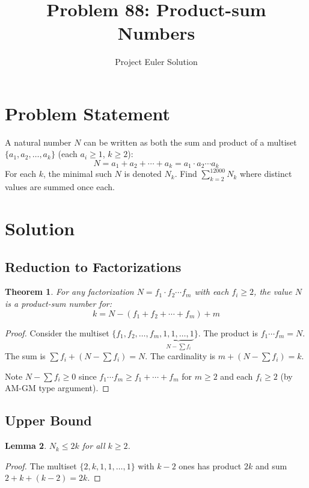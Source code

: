 \documentclass[12pt,a4paper]{article}
\title{Problem 88: Product-sum Numbers}
\author{Project Euler Solution}
\date{}
\newtheorem{theorem}{Theorem}
\newtheorem{lemma}[theorem]{Lemma}
\theoremstyle{definition}
\begin{document}
\maketitle

\section{Problem Statement}
A natural number $N$ can be written as both the sum and product of a multiset $\{a_1, a_2, \ldots, a_k\}$ (each $a_i \ge 1$, $k \ge 2$):
\[
N = a_1 + a_2 + \cdots + a_k = a_1 \cdot a_2 \cdots a_k
\]
For each $k$, the minimal such $N$ is denoted $N_k$. Find $\displaystyle\sum_{k=2}^{12000} N_k$ where distinct values are summed once each.

\section{Solution}

\subsection{Reduction to Factorizations}
\begin{theorem}
For any factorization $N = f_1 \cdot f_2 \cdots f_m$ with each $f_i \ge 2$, the value $N$ is a product-sum number for:
\[
k = N - (f_1 + f_2 + \cdots + f_m) + m
\]
\end{theorem}

\begin{proof}
Consider the multiset $\{f_1, f_2, \ldots, f_m, \underbrace{1, 1, \ldots, 1}_{N - \sum f_i}\}$. The product is $f_1 \cdots f_m = N$. The sum is $\sum f_i + (N - \sum f_i) = N$. The cardinality is $m + (N - \sum f_i) = k$.

Note $N - \sum f_i \ge 0$ since $f_1 \cdots f_m \ge f_1 + \cdots + f_m$ for $m \ge 2$ and each $f_i \ge 2$ (by AM-GM type argument).
\end{proof}

\subsection{Upper Bound}
\begin{lemma}
$N_k \le 2k$ for all $k \ge 2$.
\end{lemma}
\begin{proof}
The multiset $\{2, k, 1, 1, \ldots, 1\}$ with $k-2$ ones has product $2k$ and sum $2 + k + (k-2) = 2k$.
\end{proof}
\end{document}
